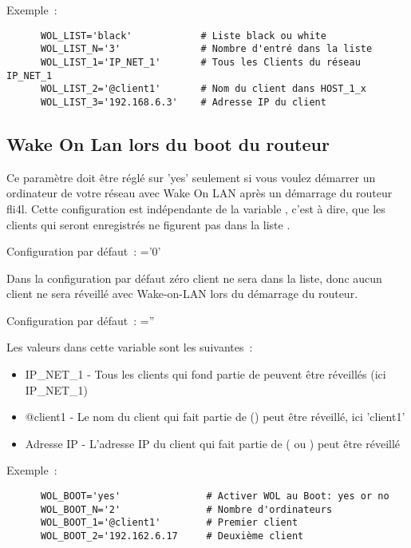\begin{description}
Exemple~:
\begin{example}
\begin{verbatim}
      WOL_LIST='black'            # Liste black ou white
      WOL_LIST_N='3'              # Nombre d'entré dans la liste
      WOL_LIST_1='IP_NET_1'       # Tous les Clients du réseau IP_NET_1
      WOL_LIST_2='@client1'       # Nom du client dans HOST_1_x
      WOL_LIST_3='192.168.6.3'    # Adresse IP du client
\end{verbatim}
\end{example}

\end{description}

\subsection{Wake On Lan lors du boot du routeur}
\begin{description}


Ce paramètre doit être réglé sur 'yes' seulement si vous voulez démarrer un
ordinateur de votre réseau avec Wake On LAN après un démarrage du routeur fli4l.
Cette configuration est indépendante de la variable , c'est à
dire, que les clients qui seront enregistrés ne figurent pas dans la liste
.


  Configuration par défaut~:  ='0'

  Dans la configuration par défaut zéro client ne sera dans la liste, donc aucun
  client ne sera réveillé avec Wake-on-LAN lors du démarrage du routeur.


  Configuration par défaut~:  =''

  Les valeurs dans cette variable sont les suivantes~:
  \begin{itemize}
    \item IP\_NET\_1 - Tous les clients qui fond partie de 
      peuvent être réveillés (ici IP\_NET\_1)
    \item @client1 - Le nom du client qui fait partie de ()
      peut être réveillé, ici 'client1'
    \item Adresse IP - L'adresse IP du client qui fait partie de (
      ou ) peut être réveillé
  \end{itemize}

Exemple~:
\begin{example}
\begin{verbatim}
      WOL_BOOT='yes'               # Activer WOL au Boot: yes or no
      WOL_BOOT_N='2'               # Nombre d'ordinateurs
      WOL_BOOT_1='@client1'        # Premier client
      WOL_BOOT_2='192.162.6.17     # Deuxième client
\end{verbatim}
\end{example}

\end{description}

